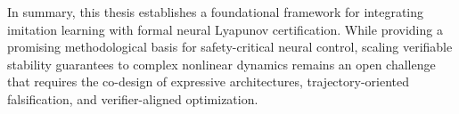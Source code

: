 In summary, this thesis establishes a foundational framework for integrating imitation learning with formal 
neural Lyapunov certification. While providing a promising methodological basis for safety-critical neural control, 
scaling verifiable stability guarantees to complex nonlinear dynamics remains an open challenge that requires 
the co-design of expressive architectures, trajectory-oriented falsification, and verifier-aligned optimization.